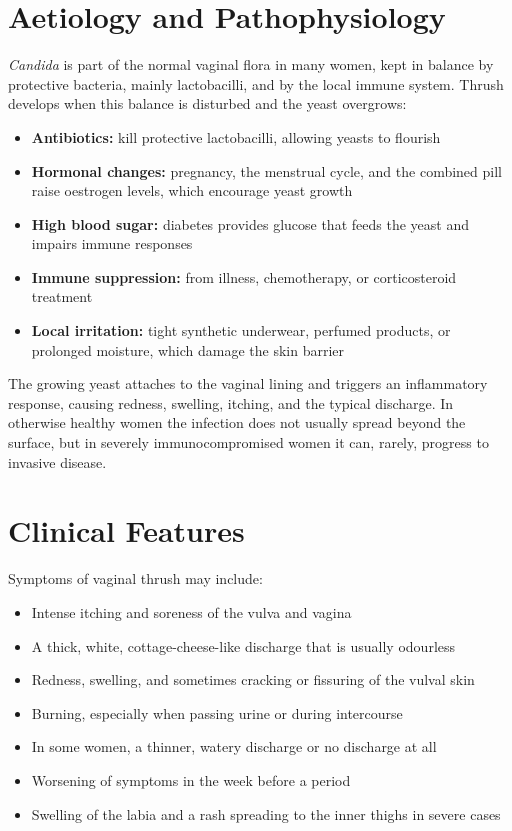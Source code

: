 \section*{Aetiology and Pathophysiology}
\textit{Candida} is part of the normal vaginal flora in many women, kept in balance by protective bacteria, mainly lactobacilli, and by the local immune system. Thrush develops when this balance is disturbed and the yeast overgrows:
\begin{itemize}
    \item \textbf{Antibiotics:} kill protective lactobacilli, allowing yeasts to flourish
    \item \textbf{Hormonal changes:} pregnancy, the menstrual cycle, and the combined pill raise oestrogen levels, which encourage yeast growth
    \item \textbf{High blood sugar:} diabetes provides glucose that feeds the yeast and impairs immune responses
    \item \textbf{Immune suppression:} from illness, chemotherapy, or corticosteroid treatment
    \item \textbf{Local irritation:} tight synthetic underwear, perfumed products, or prolonged moisture, which damage the skin barrier
\end{itemize}
The growing yeast attaches to the vaginal lining and triggers an inflammatory response, causing redness, swelling, itching, and the typical discharge. In otherwise healthy women the infection does not usually spread beyond the surface, but in severely immunocompromised women it can, rarely, progress to invasive disease.

\section*{Clinical Features}
Symptoms of vaginal thrush may include:
\begin{itemize}
    \item Intense itching and soreness of the vulva and vagina
    \item A thick, white, cottage-cheese-like discharge that is usually odourless
    \item Redness, swelling, and sometimes cracking or fissuring of the vulval skin
    \item Burning, especially when passing urine or during intercourse
    \item In some women, a thinner, watery discharge or no discharge at all
    \item Worsening of symptoms in the week before a period
    \item Swelling of the labia and a rash spreading to the inner thighs in severe cases
\end{itemize}

